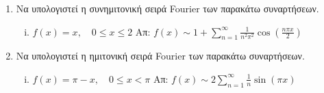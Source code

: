 \begin{enumerate}
  \item Να υπολογιστεί η συνημιτονική σειρά Fourier των παρακάτω συναρτήσεων.
    \begin{enumerate}[i)]
       \item $ f(x) = x, \quad 0 \leq x \leq 2 $ 
         \hfill Απ: $ f(x) \sim 1 + \sum_{n=1}^{\infty} \frac{1}{n^{2} \pi ^{2}}
         \cos{\left(\frac{n \pi x}{2}\right)} $ 
    \end{enumerate}

  \item Να υπολογιστεί η ημιτονική σειρά Fourier των παρακάτω συναρτήσεων.
    \begin{enumerate}[i)]
      \item $ f(x) = \pi - x, \quad 0 \leq x < \pi $
        \hfill Απ: $ f(x) \sim 2\sum_{n=1}^{\infty} \frac{1}{n} \sin{(\pi x)}$ 
    \end{enumerate}
\end{enumerate}

